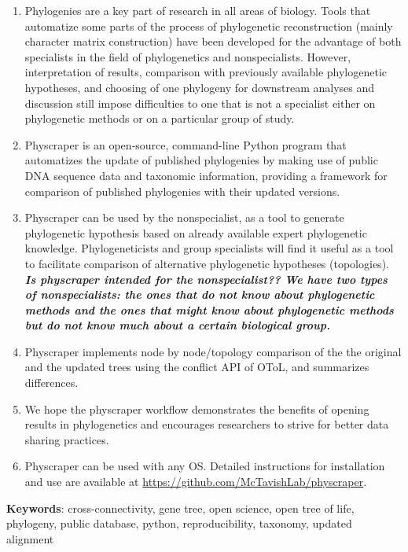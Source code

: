 \documentclass[]{article}
\begin{document}
\begin{enumerate}
\def\labelenumi{\arabic{enumi}.}
\item
  Phylogenies are a key part of research in all areas of biology. Tools that automatize
  some parts of the process of phylogenetic reconstruction (mainly character matrix construction)
  have been developed for the advantage of both specialists in the field of phylogenetics and nonspecialists.
  However, interpretation of results, comparison with previously available phylogenetic
  hypotheses, and choosing of one phylogeny for downstream analyses and discussion still impose difficulties
  to one that is not a specialist either on phylogenetic methods or on a particular group of study.
\item
  Physcraper is an open‐source, command-line Python program that automatizes the update of published
  phylogenies by making use of public DNA sequence data and taxonomic information,
  providing a framework for comparison of published phylogenies with their updated versions.
\item
  Physcraper can be used by the nonspecialist, as a tool to generate phylogenetic
  hypothesis based on already available expert phylogenetic knowledge.
  Phylogeneticists and group specialists will find it useful as a tool to facilitate comparison
  of alternative phylogenetic hypotheses (topologies).
  \textbf{\emph{Is physcraper intended for the nonspecialist?? We have two types of nonspecialists:
  the ones that do not know about phylogenetic methods and the ones that might know
  about phylogenetic methods but do not know much about a certain biological group.}}
\item
  Physcraper implements node by node/topology comparison of the the original and the updated
  trees using the conflict API of OToL, and summarizes differences.
\item
  We hope the physcraper workflow demonstrates the benefits of opening results in phylogenetics and encourages researchers to strive for better data sharing practices.
\item
  Physcraper can be used with any OS. Detailed instructions for installation and
  use are available at \url{https://github.com/McTavishLab/physcraper}.
\end{enumerate}

\textbf{Keywords}: cross-connectivity, gene tree, open science, open tree of life, phylogeny, public database, python, reproducibility, taxonomy, updated alignment

\newpage
\end{document}
